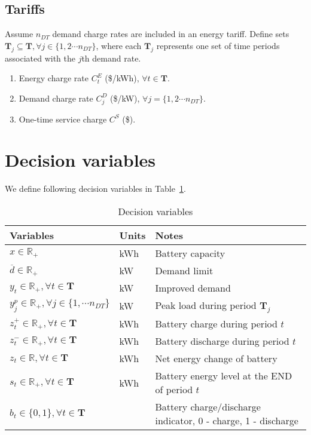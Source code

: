 \documentclass[11pt]{article}
\begin{document}
\subsection{Tariffs}
Assume $n_{DT}$ demand charge rates are included in an energy tariff. Define sets $\textbf{T}_j \subseteq \textbf{T}, \forall j \in \{1,2 \cdots n_{DT} \}$, where each $\textbf{T}_j$ represents one set of time periods associated with the $j$th demand rate.
\begin{enumerate}
	\item Energy charge rate $C^E_t$ (\$/kWh), $\forall t \in \textbf{T}$.
	\item Demand charge rate $C^D_j$ (\$/kW), $\forall j = \{1,2 \cdots n_{DT} \}$.
	\item One-time service charge $C^S$ (\$).
\end{enumerate}

\section{Decision variables}
We define following decision variables in Table~\ref{my-label2}.

\begin{table}[H]
	\centering
	\caption{Decision variables}
	\label{my-label2}
	\begin{tabular}{lll}
		\hline
		Variables                                                    & Units & Notes                                                         \\
		\hline
		$x\in \mathbb{R}_+$                                          & kWh   & Battery capacity                                              \\
		$\overline{d}\in \mathbb{R}_+$                               & kW    & Demand limit                                                  \\
		$y_t\in \mathbb{R}_+, \forall t \in \mathbf{T}$              & kW    & Improved demand                                               \\
		$y^p_j\in \mathbb{R}_+, \forall j \in \{1, \cdots n_{DT} \}$ & kW    & Peak load during period $\mathbf{T}_j$                        \\
		$z^+_t\in \mathbb{R}_+, \forall t \in \mathbf{T}$            & kWh   & Battery charge during period $t$                              \\
		$z^-_t\in \mathbb{R}_+, \forall t \in \mathbf{T}$            & kWh   & Battery discharge during period $t$                           \\
		$z_t\in \mathbb{R}, \forall t \in \mathbf{T}$                & kWh   & Net energy change of battery                                  \\
		$s_t \in \mathbb{R}_+, \forall t \in \mathbf{T}$             & kWh   & Battery energy level at the END of period $t$                 \\
		$b_t \in \{0, 1\}, \forall t \in \mathbf{T}$                 &       & Battery charge/discharge indicator, 0 - charge, 1 - discharge \\
		\hline
	\end{tabular}
\end{table}
\end{document}
